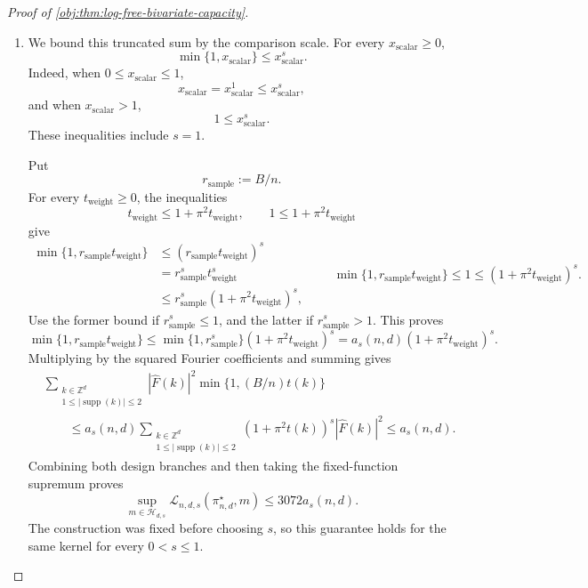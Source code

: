 \begin{proof}[Proof of \cref{obj:thm:log-free-bivariate-capacity}]
\begin{enumerate}
\item
We bound this truncated sum by the comparison scale. For every
\(x_{\mathrm{scalar}}\geq0\),
\[
\min\{1,x_{\mathrm{scalar}}\}\leq x_{\mathrm{scalar}}^s.
\]
Indeed, when \(0\leq x_{\mathrm{scalar}}\leq1\),
\[
x_{\mathrm{scalar}}
=x_{\mathrm{scalar}}^1
\leq x_{\mathrm{scalar}}^s,
\]
and when \(x_{\mathrm{scalar}}>1\),
\[
1\leq x_{\mathrm{scalar}}^s.
\]
These inequalities include \(s=1\).

Put
\[
r_{\mathrm{sample}}:=B/n.
\]
For every \(t_{\mathrm{weight}}\geq0\), the inequalities
\[
t_{\mathrm{weight}}\leq1+\pi^2t_{\mathrm{weight}},
\qquad
1\leq1+\pi^2t_{\mathrm{weight}}
\]
give
\[
\begin{aligned}
\min\{1,r_{\mathrm{sample}}t_{\mathrm{weight}}\}
&\leq
(r_{\mathrm{sample}}t_{\mathrm{weight}})^s\\
&=
r_{\mathrm{sample}}^s t_{\mathrm{weight}}^s\\
&\leq
r_{\mathrm{sample}}^s(1+\pi^2t_{\mathrm{weight}})^s,
\end{aligned}
\qquad
\min\{1,r_{\mathrm{sample}}t_{\mathrm{weight}}\}
\leq1\leq(1+\pi^2t_{\mathrm{weight}})^s.
\]
Use the former bound if \(r_{\mathrm{sample}}^s\leq1\), and the latter if
\(r_{\mathrm{sample}}^s>1\). This proves
\[
\min\{1,r_{\mathrm{sample}}t_{\mathrm{weight}}\}
\leq
\min\{1,r_{\mathrm{sample}}^s\}
(1+\pi^2t_{\mathrm{weight}})^s
=
a_s(n,d)(1+\pi^2t_{\mathrm{weight}})^s.
\]
Multiplying by the squared Fourier coefficients and summing gives
\[
\begin{aligned}
&\sum_{\substack{k\in\mathbb Z^d\\
1\leq|\operatorname{supp}(k)|\leq2}}
|\widehat F(k)|^2\min\{1,(B/n)t(k)\}\\
&\qquad\leq
a_s(n,d)
\sum_{\substack{k\in\mathbb Z^d\\
1\leq|\operatorname{supp}(k)|\leq2}}
(1+\pi^2t(k))^s|\widehat F(k)|^2
\leq a_s(n,d).
\end{aligned}
\]
Combining both design branches and then taking the fixed-function supremum proves
\[
\sup_{m\in\mathcal H_{d,s}}
\mathcal L_{n,d,s}(\pi^\star_{n,d},m)
\leq3072a_s(n,d).
\]
The construction was fixed before choosing \(s\), so this guarantee holds for the same kernel for every \(0<s\leq1\).


\end{enumerate}
\end{proof}
